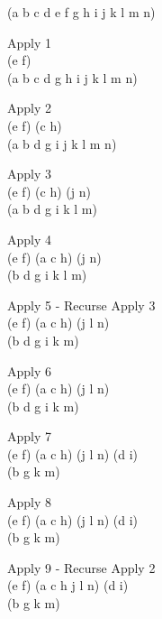 \documentclass[paper=a4, fontsize=11pt]{scrartcl}
\numberwithin{equation}{section}		%
\numberwithin{figure}{section}			%
\numberwithin{table}{section}				%
\begin{document}
\begin{center}
(a b c d e f g h i j k l m n)\\
\vspace{4mm}

Apply 1 \\
(e f) \\ (a b c d g h i j k l m n)\\
\vspace{4mm}

Apply 2 \\
(e f) (c h) \\ (a b d g i j k l m n)\\
\vspace{4mm}

Apply 3 \\
(e f) (c h) (j n) \\ (a b d g i k l m)\\
\vspace{4mm}

Apply 4 \\
(e f) (a c h) (j n) \\ (b d g i k l m)\\
\vspace{4mm}

Apply 5 - Recurse Apply 3\\
(e f) (a c h) (j l n) \\ (b d g i k m)\\
\vspace{4mm}

Apply 6 \\
(e f) (a c h) (j l n) \\ (b d g i k m)\\
\vspace{4mm}

Apply 7 \\
(e f) (a c h) (j l n) (d i) \\ (b g k m)\\
\vspace{4mm}

Apply 8 \\
(e f) (a c h) (j l n) (d i) \\ (b g k m)\\
\vspace{4mm}

Apply 9 - Recurse Apply 2\\
(e f) (a c h j l n) (d i) \\ (b g k m)\\
\vspace{4mm}


\end{center}
\end{document}
